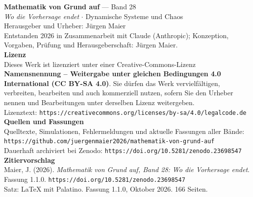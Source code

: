 \thispagestyle{empty}
\vspace*{\fill}
\begin{flushleft}
{\small\color{grau}
\textbf{\color{tief}Mathematik von Grund auf} --- Band 28\\[2pt]
\textit{Wo die Vorhersage endet} $\cdot$ Dynamische Systeme und Chaos\\[14pt]

Herausgeber und Urheber: Jürgen Maier\\[2pt]
Entstanden 2026 in Zusammenarbeit mit Claude (Anthropic); Konzeption, Vorgaben, Prüfung und Herausgeberschaft: Jürgen Maier.\\[14pt]

\textbf{Lizenz}\\[2pt]
Dieses Werk ist lizenziert unter einer Creative-Commons-Lizenz \textbf{Namensnennung -- Weitergabe unter gleichen Bedingungen 4.0 International (CC BY-SA 4.0)}. Sie dürfen das Werk vervielfältigen, verbreiten, bearbeiten und auch kommerziell nutzen, sofern Sie den Urheber nennen und Bearbeitungen unter derselben Lizenz weitergeben.\\[2pt]
Lizenztext: \texttt{https://creativecommons.org/licenses/by-sa/4.0/legalcode.de}\\[14pt]

\textbf{Quellen und Fassungen}\\[2pt]
Quelltexte, Simulationen, Fehlermeldungen und aktuelle Fassungen aller Bände:\\
\texttt{https://github.com/juergenmaier2026/mathematik-von-grund-auf}\\[2pt]
Dauerhaft archiviert bei Zenodo: \texttt{https://doi.org/10.5281/zenodo.23698547}\\[14pt]

\textbf{Zitiervorschlag}\\[2pt]
Maier, J. (2026). \textit{Mathematik von Grund auf, Band 28: Wo die Vorhersage endet}. Fassung 1.1.0. \texttt{https://doi.org/10.5281/zenodo.23698547}\\[14pt]

Satz: \LaTeX{} mit Palatino. Fassung 1.1.0, Oktober 2026. 166 Seiten.
}
\end{flushleft}
\vspace*{1.5cm}
